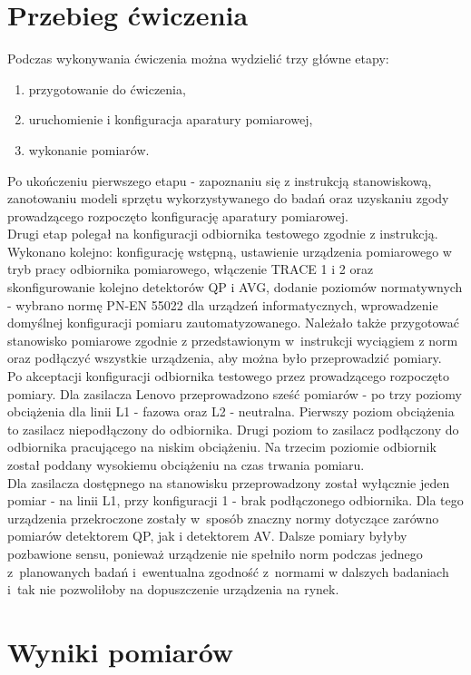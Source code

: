 \documentclass[12pt, a4paper, oneside]{article}
\begin{document}
\section{Przebieg ćwiczenia}
\indent\indent Podczas wykonywania ćwiczenia można wydzielić trzy główne etapy:
\begin{enumerate}
\item przygotowanie do ćwiczenia,
\item uruchomienie i konfiguracja aparatury pomiarowej,
\item wykonanie pomiarów.
\end{enumerate}
\indent\indent Po ukończeniu pierwszego etapu - zapoznaniu się z instrukcją stanowiskową, zanotowaniu modeli sprzętu wykorzystywanego do badań oraz uzyskaniu zgody prowadzącego rozpoczęto konfigurację aparatury pomiarowej.\\
\indent Drugi etap polegał na konfiguracji odbiornika testowego zgodnie z instrukcją. Wykonano kolejno: konfigurację wstępną, ustawienie urządzenia pomiarowego w tryb pracy odbiornika pomiarowego, włączenie TRACE 1 i 2 oraz skonfigurowanie kolejno detektorów QP i AVG, dodanie poziomów normatywnych - wybrano normę PN-EN 55022 dla urządzeń informatycznych, wprowadzenie domyślnej konfiguracji pomiaru zautomatyzowanego. Należało także przygotować stanowisko pomiarowe zgodnie z przedstawionym w~instrukcji wyciągiem z norm oraz podłączyć wszystkie urządzenia, aby można było przeprowadzić pomiary.\\
\indent Po akceptacji konfiguracji odbiornika testowego przez prowadzącego rozpoczęto pomiary. Dla zasilacza Lenovo przeprowadzono sześć pomiarów - po trzy poziomy obciążenia dla linii L1 - fazowa oraz L2 - neutralna. Pierwszy poziom obciążenia to zasilacz niepodłączony do odbiornika. Drugi poziom to zasilacz podłączony do odbiornika pracującego na niskim obciążeniu. Na trzecim poziomie odbiornik został poddany wysokiemu obciążeniu na czas trwania pomiaru.\\
Dla zasilacza dostępnego na stanowisku przeprowadzony został wyłącznie jeden pomiar - na linii L1, przy konfiguracji 1 - brak podłączonego odbiornika. Dla tego urządzenia przekroczone zostały w~sposób znaczny normy dotyczące zarówno pomiarów detektorem QP, jak i detektorem AV. Dalsze pomiary byłyby pozbawione sensu, ponieważ urządzenie nie spełniło norm podczas jednego z~planowanych badań i~ewentualna zgodność z~normami w dalszych badaniach i~tak nie pozwoliłoby na dopuszczenie urządzenia na rynek.
\clearpage
\section{Wyniki pomiarów}
\end{document}

